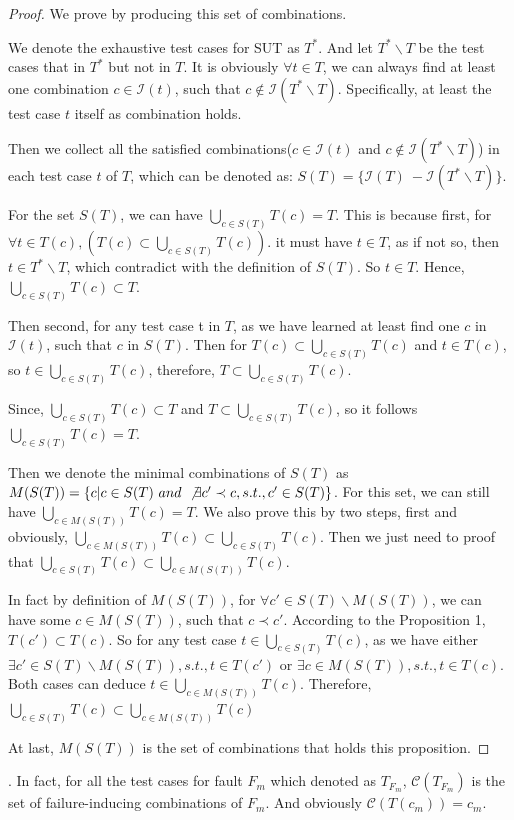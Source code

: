 \documentclass{sig-alternate}
\begin{document}
\begin{proof}
We prove by producing this set of combinations.

We denote the exhaustive test cases for SUT as $T^{*}$. And let $T^{*} \backslash T$ be the test cases that in $T^{*}$ but not in $T$. It is obviously $\forall t \in T $, we can always find at least one combination $c \in \mathcal{I}(t)$, such that $c \not\in \mathcal{I}(T^{*} \backslash T)$. Specifically, at least the test case $t$ itself as combination holds.

Then we collect all the satisfied combinations($c \in \mathcal{I}(t)$  and $c \not\in \mathcal{I}(T^{*} \backslash T)$) in each test case $t$ of $T$, which can be denoted as:
$S(T) = \{ \mathcal{I}(T)\ - \mathcal{I}(T^{*} \backslash T) \}$.

For the set $S(T)$, we can have $ \bigcup_{c \in S(T)}T(c) = T$. This is because first, for $\forall t \in T(c), (T(c) \subset \bigcup_{c \in S(T)}T(c))$. it must have $t \in T$, as if not so, then $t \in T^{*} \backslash T$, which contradict with the definition of $S(T)$. So $t \in T$. Hence, $\bigcup_{c \in S(T)}T(c) \subset T$.

Then second, for any test case t in $T$, as we have learned at least find one $c$ in $\mathcal{I}(t)$, such that $c$ in $S(T)$. Then for $T(c) \subset \bigcup_{c \in S(T)} T(c)$ and $t \in T(c)$, so $t \in \bigcup_{c \in S(T)} T(c)$, therefore,  $ T \subset \bigcup_{c \in S(T)}T(c)$.

Since, $\bigcup_{c \in S(T)}T(c) \subset T$ and $ T \subset \bigcup_{c \in S(T)}T(c)$, so it follows $\bigcup_{c \in S(T)}T(c) = T$.

Then we denote the minimal combinations of $S(T)$ as $M(S(T)) = \{c | c \in S(T)\ and\ \not\exists c' \prec c, s.t., c' \in S(T)\}$. For this set, we can still have $ \bigcup_{c \in M(S(T))} T(c) = T$. We also prove this by two steps, first and obviously, $\bigcup_{c \in M(S(T))} T(c) \subset \bigcup_{c \in S(T)} T(c)$. Then we just need to proof that $\bigcup_{c \in S(T)} T(c) \subset \bigcup_{c \in M(S(T))} T(c)$.

In fact by definition of $M(S(T))$, for $\forall c'\in S(T) \backslash M(S(T))$,  we can have some $c \in M(S(T))$, such that $c \prec c'$. According to the Proposition 1, $T(c') \subset T(c)$. So for any test case $t \in \bigcup_{c \in S(T)} T(c) $, as we have either $\exists c'\in S(T) \backslash M(S(T)), s.t., t \in T(c')$ or $\exists c \in M(S(T)), s.t., t \in T(c)$. Both cases can deduce $t \in \bigcup_{c \in M(S(T))} T(c)$. Therefore, $\bigcup_{c \in S(T)} T(c) \subset \bigcup_{c \in M(S(T))} T(c)$

At last, $M(S(T))$ is the set of combinations that holds this proposition.
\end{proof}.
In fact, for all the test cases for fault $F_{m}$ which denoted as $T_{F_{m}}$, $\mathcal{C}(T_{F_{m}})$ is the set of failure-inducing combinations of $F_{m}$. And obviously $\mathcal{C}(T(c_{m})) = c_{m}$.
\end{document}
